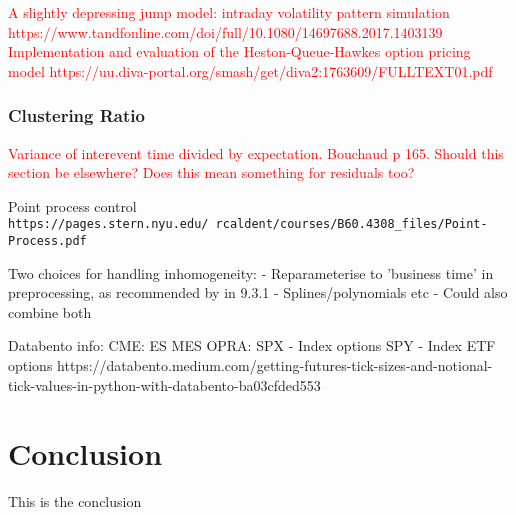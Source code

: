 \documentclass[honours,12pt]{unswthesis}
\numberwithin{equation}{section}
\begin{document}
\textcolor{red}{A slightly depressing jump model: intraday volatility pattern simulation https://www.tandfonline.com/doi/full/10.1080/14697688.2017.1403139}
\textcolor{red}{Implementation and evaluation of the Heston-Queue-Hawkes option pricing model https://uu.diva-portal.org/smash/get/diva2:1763609/FULLTEXT01.pdf}

\subsection{Clustering Ratio}
\textcolor{red}{Variance of interevent time divided by expectation. Bouchaud p 165. Should this section be elsewhere? Does this mean something for residuals too?}

Point process control \texttt{https://pages.stern.nyu.edu/~rcaldent/courses/B60.4308_files/Point-Process.pdf}

Two choices for handling inhomogeneity:
- Reparameterise to 'business time' in preprocessing, as recommended by \cite{BouchaudEtAl} in 9.3.1
- Splines/polynomials etc
- Could also combine both


Databento info:
CME:
ES
MES
OPRA:
SPX - Index options
SPY - Index ETF options
https://databento.medium.com/getting-futures-tick-sizes-and-notional-tick-values-in-python-with-databento-ba03cfded553

\chapter{Conclusion}\label{ccl}


This is the conclusion







\clearpage
{}

\end{document}
